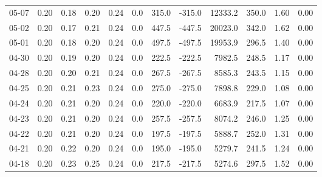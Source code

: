 \begin{threeparttable}
{\begin{tabular}{lrrrrrrrrrrr}
  05-07 &          0.20 &          0.18 &          0.20 &        0.24 &                 0.0 &               315.0 &     -315.0 &             12333.2 &            350.0 &            1.60 &                   0.00 \\
  05-02 &          0.20 &          0.17 &          0.21 &        0.24 &                 0.0 &               447.5 &     -447.5 &             20023.0 &            342.0 &            1.62 &                   0.00 \\
  05-01 &          0.20 &          0.18 &          0.20 &        0.24 &                 0.0 &               497.5 &     -497.5 &             19953.9 &            296.5 &            1.40 &                   0.00 \\
  04-30 &          0.20 &          0.19 &          0.20 &        0.24 &                 0.0 &               222.5 &     -222.5 &              7982.5 &            248.5 &            1.17 &                   0.00 \\
  04-28 &          0.20 &          0.20 &          0.21 &        0.24 &                 0.0 &               267.5 &     -267.5 &              8585.3 &            243.5 &            1.15 &                   0.00 \\
  04-25 &          0.20 &          0.21 &          0.23 &        0.24 &                 0.0 &               275.0 &     -275.0 &              7898.8 &            229.0 &            1.08 &                   0.00 \\
  04-24 &          0.20 &          0.21 &          0.20 &        0.24 &                 0.0 &               220.0 &     -220.0 &              6683.9 &            217.5 &            1.07 &                   0.00 \\
  04-23 &          0.20 &          0.21 &          0.20 &        0.24 &                 0.0 &               257.5 &     -257.5 &              8074.2 &            246.0 &            1.25 &                   0.00 \\
  04-22 &          0.20 &          0.21 &          0.20 &        0.24 &                 0.0 &               197.5 &     -197.5 &              5888.7 &            252.0 &            1.31 &                   0.00 \\
  04-21 &          0.20 &          0.22 &          0.20 &        0.24 &                 0.0 &               195.0 &     -195.0 &              5279.7 &            241.5 &            1.24 &                   0.00 \\
  04-18 &          0.20 &          0.23 &          0.25 &        0.24 &                 0.0 &               217.5 &     -217.5 &              5274.6 &            297.5 &            1.52 &                   0.00 \\

\end{tabular}}
\end{threeparttable}
